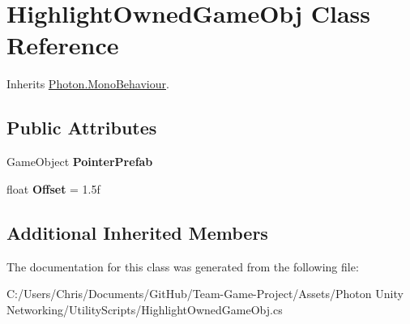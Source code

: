 \hypertarget{class_highlight_owned_game_obj}{}\section{Highlight\+Owned\+Game\+Obj Class Reference}
\label{class_highlight_owned_game_obj}


Inherits \hyperlink{class_photon_1_1_mono_behaviour}{Photon.\+Mono\+Behaviour}.

\subsection*{Public Attributes}
\begin{DoxyCompactItemize}
\item 
Game\+Object {\bfseries Pointer\+Prefab}\hypertarget{class_highlight_owned_game_obj_ad94db2e57c7b1b7d66dc1744f7571362}{}\label{class_highlight_owned_game_obj_ad94db2e57c7b1b7d66dc1744f7571362}

\item 
float {\bfseries Offset} = 1.\+5f\hypertarget{class_highlight_owned_game_obj_a627640117867653ad7baf37c1b390e33}{}\label{class_highlight_owned_game_obj_a627640117867653ad7baf37c1b390e33}

\end{DoxyCompactItemize}
\subsection*{Additional Inherited Members}


The documentation for this class was generated from the following file\+:\begin{DoxyCompactItemize}
\item 
C\+:/\+Users/\+Chris/\+Documents/\+Git\+Hub/\+Team-\/\+Game-\/\+Project/\+Assets/\+Photon Unity Networking/\+Utility\+Scripts/Highlight\+Owned\+Game\+Obj.\+cs\end{DoxyCompactItemize}
